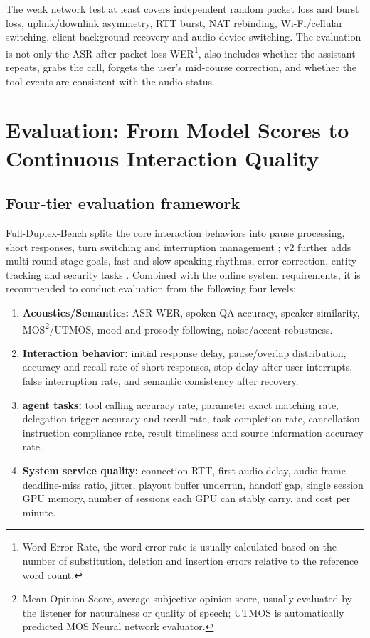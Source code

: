 \documentclass[UTF8,fontset=none,a4paper,10pt]{ctexart}
\begin{document}
The weak network test at least covers independent random packet loss and burst loss, uplink/downlink asymmetry, RTT burst, NAT rebinding, Wi-Fi/cellular switching, client background recovery and audio device switching. The evaluation is not only the ASR after packet loss WER\footnote{Word Error Rate, the word error rate is usually calculated based on the number of substitution, deletion and insertion errors relative to the reference word count. }, also includes whether the assistant repeats, grabs the call, forgets the user's mid-course correction, and whether the tool events are consistent with the audio status.

\section{Evaluation: From Model Scores to Continuous Interaction Quality}

\subsection{Four-tier evaluation framework}

Full-Duplex-Bench splits the core interaction behaviors into pause processing, short responses, turn switching and interruption management \cite{lin2025fullduplexbench}; v2 further adds multi-round stage goals, fast and slow speaking rhythms, error correction, entity tracking and security tasks \cite{lin2026fullduplexbenchv2}. Combined with the online system requirements, it is recommended to conduct evaluation from the following four levels:

\begin{enumerate}
\item \textbf{ Acoustics/Semantics: }ASR WER, spoken QA accuracy, speaker similarity, MOS\footnote{Mean Opinion Score, average subjective opinion score, usually evaluated by the listener for naturalness or quality of speech; UTMOS is automatically predicted MOS Neural network evaluator. }/UTMOS, mood and prosody following, noise/accent robustness.
\item \textbf{ Interaction behavior: } initial response delay, pause/overlap distribution, accuracy and recall rate of short responses, stop delay after user interrupts, false interruption rate, and semantic consistency after recovery.
\item \textbf{ agent tasks: } tool calling accuracy rate, parameter exact matching rate, delegation trigger accuracy and recall rate, task completion rate, cancellation instruction compliance rate, result timeliness and source information accuracy rate.
\item \textbf{ System service quality: }connection RTT, first audio delay, audio frame deadline-miss ratio, jitter, playout buffer underrun, handoff gap, single session GPU memory, number of sessions each GPU can stably carry, and cost per minute.
\end{enumerate}
\end{document}
